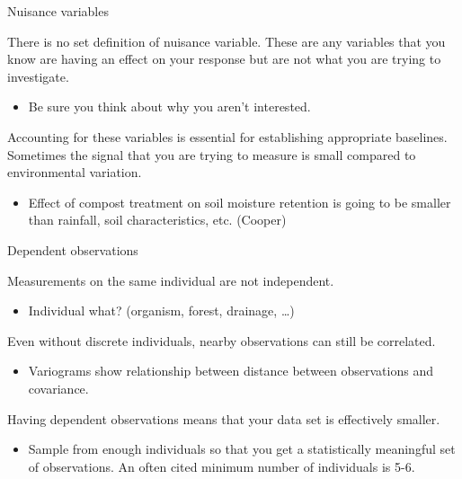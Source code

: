 \documentclass[
  ignorenonframetext,
]{beamer}
\providecommand{\tightlist}{%
  \setlength{\itemsep}{0pt}\setlength{\parskip}{0pt}}
\begin{document}
\begin{frame}{Nuisance variables}
\protect\hypertarget{nuisance-variables}{}

There is no set definition of nuisance variable. These are any variables
that you know are having an effect on your response but are not what you
are trying to investigate.

\begin{itemize}
\tightlist
\item
  Be sure you think about why you aren't interested.
\end{itemize}

Accounting for these variables is essential for establishing appropriate
baselines. Sometimes the signal that you are trying to measure is small
compared to environmental variation.

\begin{itemize}
\tightlist
\item
  Effect of compost treatment on soil moisture retention is going to be
  smaller than rainfall, soil characteristics, etc. (Cooper)
\end{itemize}

\end{frame}

\begin{frame}{Dependent observations}
\protect\hypertarget{dependent-observations}{}

Measurements on the same individual are not independent.

\begin{itemize}
\tightlist
\item
  Individual what? (organism, forest, drainage, \ldots)
\end{itemize}

Even without discrete individuals, nearby observations can still be
correlated.

\begin{itemize}
\tightlist
\item
  Variograms show relationship between distance between observations and
  covariance.
\end{itemize}

Having dependent observations means that your data set is effectively
smaller.

\begin{itemize}
\tightlist
\item
  Sample from enough individuals so that you get a statistically
  meaningful set of observations. An often cited minimum number of
  individuals is 5-6.
\end{itemize}

\end{frame}
\end{document}
